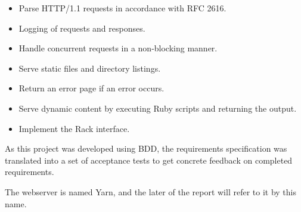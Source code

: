 \begin{itemize}
  \item Parse HTTP/1.1 requests in accordance with RFC 2616.
  \item Logging of requests and responses.
  \item Handle concurrent requests in a non-blocking manner.
  \item Serve static files and directory listings.
  \item Return an error page if an error occurs.
  \item Serve dynamic content by executing Ruby scripts and returning the
  output.
  \item Implement the Rack interface.
\end{itemize}

As this project was developed using BDD, the requirements specification was
translated into a set of acceptance tests to get concrete feedback on
completed requirements.

The webserver is named Yarn, and the later of the report will refer to it by
this name.
